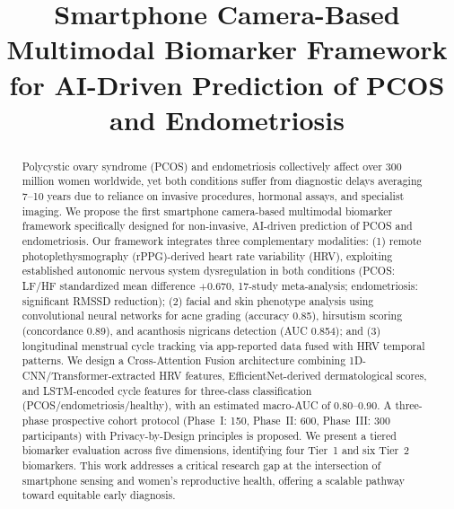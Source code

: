 \documentclass[conference]{IEEEtran}
\begin{document}
\title{Smartphone Camera-Based Multimodal Biomarker Framework for AI-Driven Prediction of PCOS and Endometriosis}

\author{
}

\maketitle

\begin{abstract}
Polycystic ovary syndrome (PCOS) and endometriosis collectively affect over 300 million women worldwide, yet both conditions suffer from diagnostic delays averaging 7--10 years due to reliance on invasive procedures, hormonal assays, and specialist imaging. We propose the first smartphone camera-based multimodal biomarker framework specifically designed for non-invasive, AI-driven prediction of PCOS and endometriosis. Our framework integrates three complementary modalities: (1) remote photoplethysmography (rPPG)-derived heart rate variability (HRV), exploiting established autonomic nervous system dysregulation in both conditions (PCOS: LF/HF standardized mean difference $+0.670$, 17-study meta-analysis; endometriosis: significant RMSSD reduction); (2) facial and skin phenotype analysis using convolutional neural networks for acne grading (accuracy 0.85), hirsutism scoring (concordance 0.89), and acanthosis nigricans detection (AUC 0.854); and (3) longitudinal menstrual cycle tracking via app-reported data fused with HRV temporal patterns. We design a Cross-Attention Fusion architecture combining 1D-CNN/Transformer-extracted HRV features, EfficientNet-derived dermatological scores, and LSTM-encoded cycle features for three-class classification (PCOS/endometriosis/healthy), with an estimated macro-AUC of 0.80--0.90. A three-phase prospective cohort protocol (Phase~I: 150, Phase~II: 600, Phase~III: 300 participants) with Privacy-by-Design principles is proposed. We present a tiered biomarker evaluation across five dimensions, identifying four Tier~1 and six Tier~2 biomarkers. This work addresses a critical research gap at the intersection of smartphone sensing and women's reproductive health, offering a scalable pathway toward equitable early diagnosis.
\end{abstract}
\end{document}
